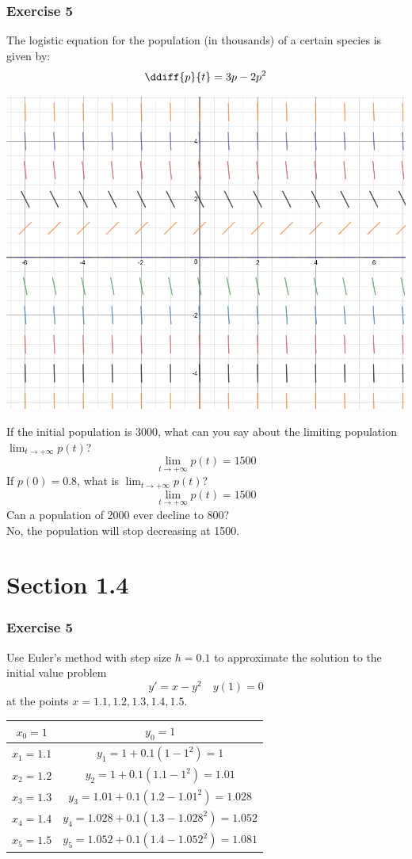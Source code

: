 \documentclass{math}
\begin{document}
\subsubsection*{Exercise 5}
The logistic equation for the population (in thousands) of a certain species is
given by:
\[ \ddiff{p}{t} = 3p-2p^2 \]
\begin{center}
  \includegraphics[width=16cm]{assets/hw_02_01.png}
\end{center}
If the initial population is 3000, what can you say about the limiting
population \( \lim_{t\to+\infty}p(t) \)?
\[ \lim_{t\to+\infty}p(t) = 1500 \]
If \( p(0) = 0.8 \), what is \( \lim_{t\to+\infty}p(t) \)?
\[ \lim_{t\to+\infty}p(t) = 1500 \]
Can a population of 2000 ever decline to 800? \\
No, the population will stop decreasing at 1500.


\section*{Section 1.4}

\subsubsection*{Exercise 5}
Use Euler's method with step size \( h = 0.1 \) to approximate the solution to
the initial value problem
\[ y' = x-y^2 \quad y(1) = 0 \]
at the points \( x = 1.1, 1.2, 1.3, 1.4, 1.5 \).
\begin{center}
  \begin{tabular}{|c|c|}
    \hline
    \( x_0 = 1 \) & \( y_0 = 1 \) \\
    \hline
    \( x_1 = 1.1 \) & \( y_1 = 1+0.1(1-1^2) = 1 \) \\
    \hline
    \( x_2 = 1.2 \) & \( y_2 = 1+0.1(1.1-1^2) = 1.01 \) \\
    \hline
    \( x_3 = 1.3 \) & \( y_3 = 1.01+0.1(1.2-1.01^2) = 1.028 \) \\
    \hline
    \( x_4 = 1.4 \) & \( y_4 = 1.028+0.1(1.3-1.028^2) = 1.052 \) \\
    \hline
    \( x_5 = 1.5 \) & \( y_5 = 1.052+0.1(1.4-1.052^2) = 1.081 \) \\
    \hline
  \end{tabular}
\end{center}
\end{document}
